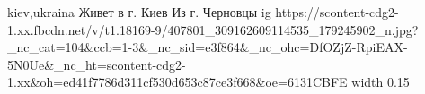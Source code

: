  
 
 
 
 

\par
kiev,ukraina
Живет в г. Киев
Из г. Черновцы
\ifcmt
  ig https://scontent-cdg2-1.xx.fbcdn.net/v/t1.18169-9/407801_309162609114535_179245902_n.jpg?_nc_cat=104&ccb=1-3&_nc_sid=e3f864&_nc_ohc=DfOZjZ-RpiEAX-5N0Ue&_nc_ht=scontent-cdg2-1.xx&oh=ed41f7786d311cf530d653c87ce3f668&oe=6131CBFE
  width 0.15
\fi


